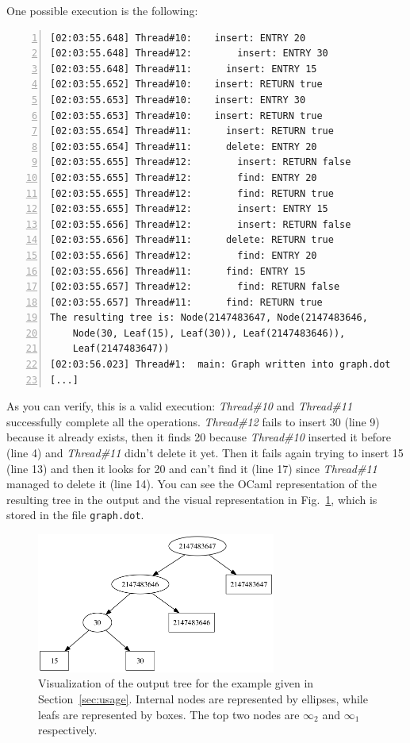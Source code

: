 \documentclass[a4paper,12pt]{article}
\newcommand{\thread}[1]{\emph{Thread\##1}}
\begin{document}
One possible execution is the following:
\renewcommand{\theFancyVerbLine}{%
  {\small\arabic{FancyVerbLine}}}
\begin{Verbatim}[numbers=left,
                 numbersep=10pt,
                 xleftmargin=8mm,
                 fontsize=\small]
[02:03:55.648] Thread#10:    insert: ENTRY 20
[02:03:55.648] Thread#12:        insert: ENTRY 30
[02:03:55.648] Thread#11:      insert: ENTRY 15
[02:03:55.652] Thread#10:    insert: RETURN true
[02:03:55.653] Thread#10:    insert: ENTRY 30
[02:03:55.653] Thread#10:    insert: RETURN true
[02:03:55.654] Thread#11:      insert: RETURN true
[02:03:55.654] Thread#11:      delete: ENTRY 20
[02:03:55.655] Thread#12:        insert: RETURN false
[02:03:55.655] Thread#12:        find: ENTRY 20
[02:03:55.655] Thread#12:        find: RETURN true
[02:03:55.655] Thread#12:        insert: ENTRY 15
[02:03:55.656] Thread#12:        insert: RETURN false
[02:03:55.656] Thread#11:      delete: RETURN true
[02:03:55.656] Thread#12:        find: ENTRY 20
[02:03:55.656] Thread#11:      find: ENTRY 15
[02:03:55.657] Thread#12:        find: RETURN false
[02:03:55.657] Thread#11:      find: RETURN true
The resulting tree is: Node(2147483647, Node(2147483646,
    Node(30, Leaf(15), Leaf(30)), Leaf(2147483646)),
    Leaf(2147483647))
[02:03:56.023] Thread#1:  main: Graph written into graph.dot
[...]
\end{Verbatim}

As you can verify, this is a valid execution: \thread{10} and \thread{11} successfully complete all the operations.
\thread{12} fails to insert 30 (line 9) because it already exists, then it finds 20 because \thread{10} inserted it before (line 4) and \thread{11} didn't delete it yet.
Then it fails again trying to insert 15 (line 13) and then it looks for 20 and can't find it (line 17) since \thread{11} managed to delete it (line 14).
You can see the OCaml representation of the resulting tree in the output and the visual representation in Fig.~\ref{fig:visual_output_tree}, which is stored in the file \texttt{graph.dot}.

\begin{figure}
    \centering
    \includegraphics[width=0.7\textwidth]{test}
    \caption{
    Visualization of the output tree for the example given in Section~\ref{sec:usage}.
    Internal nodes are represented by ellipses, while leafs are represented by boxes.
    The top two nodes are $\infty_2$ and $\infty_1$ respectively.
    }
    \label{fig:visual_output_tree}
\end{figure}
\end{document}
